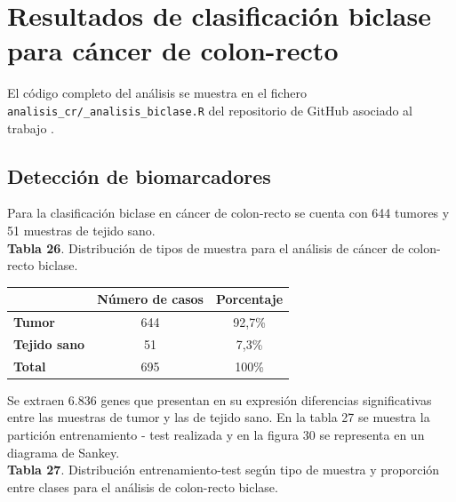 \section{Resultados de clasificación biclase para cáncer de colon-recto}

El código completo del análisis se muestra en el fichero \texttt{analisis\_cr/\_analisis\_biclase.R} del repositorio de GitHub asociado al trabajo \cite{Redondo-Sanchez2020}.

\subsection{Detección de biomarcadores}

Para la clasificación biclase en cáncer de colon-recto se cuenta con 644 tumores y 51 muestras de tejido sano.\\

\textbf{Tabla 26}. Distribución de tipos de muestra para el análisis de cáncer de colon-recto biclase.

\begin{table}[H]
	\centering
	\begin{tabular}{lcc}
		\cline{2-3}
		& \textbf{Número de casos} & \textbf{Porcentaje} \\ \hline
		\textbf{Tumor}     & 644        & 92,7\%              \\
		\textbf{Tejido sano} & 51         & 7,3\%              \\ \hline
		\textbf{Total}       & 695        & 100\%               \\ \hline
	\end{tabular}
\end{table}

Se extraen 6.836 genes que presentan en su expresión diferencias significativas entre las muestras de tumor y las de tejido sano. En la tabla 27 se muestra la partición entrenamiento - test realizada y en la figura 30 se representa en un diagrama de Sankey.\\

\textbf{Tabla 27}. Distribución entrenamiento-test según tipo de muestra y proporción entre clases para el análisis de colon-recto biclase.

